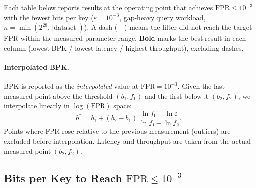 Each table below reports results at the operating point that achieves
$\mathrm{FPR} \leq 10^{-3}$ with the fewest bits per key
($\varepsilon = 10^{-3}$, gap-heavy query workload,
$n = \min(2^{28},\allowbreak\ |\text{dataset}|)$).
A dash (\textnormal{---}) means the filter did not reach the target FPR
within the measured parameter range.
\textbf{Bold} marks the best result in each column
(lowest BPK / lowest latency / highest throughput), excluding dashes.

\paragraph{Interpolated BPK.}
BPK is reported as the \emph{interpolated} value at $\mathrm{FPR}=10^{-3}$.
Given the last measured point above the threshold $(b_1, f_1)$
and the first below it $(b_2, f_2)$, we interpolate linearly
in $\log(\mathrm{FPR})$ space:
\[
  b^* = b_1 + (b_2 - b_1)\,\frac{\ln f_1 - \ln\varepsilon}{\ln f_1 - \ln f_2}.
\]
Points where FPR rose relative to the previous measurement (outliers)
are excluded before interpolation.
Latency and throughput are taken from the actual measured point $(b_2, f_2)$.

\subsection{Bits per Key to Reach \texorpdfstring{$\mathrm{FPR} \leq 10^{-3}$}{FPR <= 0.001}}
\label{subsec:eval-bpk}

